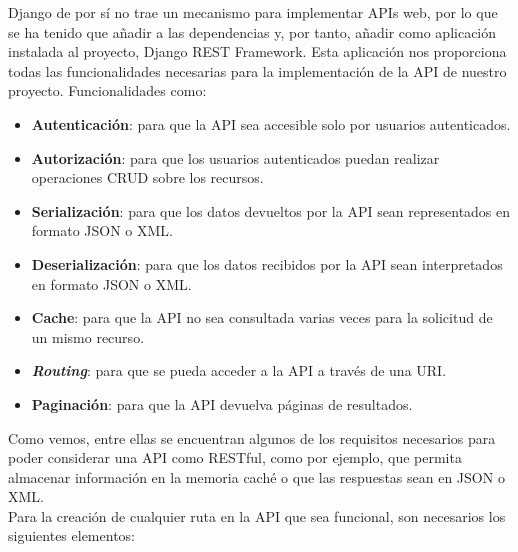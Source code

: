 Django de por sí no trae un mecanismo para implementar APIs web, por lo que se ha tenido
que añadir a las dependencias y, por tanto, añadir como aplicación instalada al proyecto,
Django REST Framework. Esta aplicación nos proporciona todas las funcionalidades
necesarias para la implementación de la API de nuestro proyecto. Funcionalidades como:

    \begin{itemize}
        \item \textbf{Autenticación}: para que la API sea accesible solo por usuarios
        autenticados.
        \item \textbf{Autorización}: para que los usuarios autenticados puedan realizar
        operaciones CRUD sobre los recursos.
        \item \textbf{Serialización}: para que los datos devueltos por la API sean
        representados en formato JSON o XML.
        \item \textbf{Deserialización}: para que los datos recibidos por la API sean
        interpretados en formato JSON o XML.
        \item \textbf{Cache}: para que la API no sea consultada varias veces para la
        solicitud de un mismo recurso.
        \item \textbf{\textit{Routing}}: para que se pueda acceder a la API  a través de
        una URI.
        \item \textbf{Paginación}: para que la API devuelva páginas de resultados.
    \end{itemize}

Como vemos, entre ellas se encuentran algunos de los requisitos necesarios para poder
considerar una API como RESTful, como por ejemplo, que permita almacenar información en
la memoria caché o que las respuestas sean en JSON o XML.\\

Para la creación de cualquier ruta en la API que sea funcional, son necesarios los
siguientes elementos:

